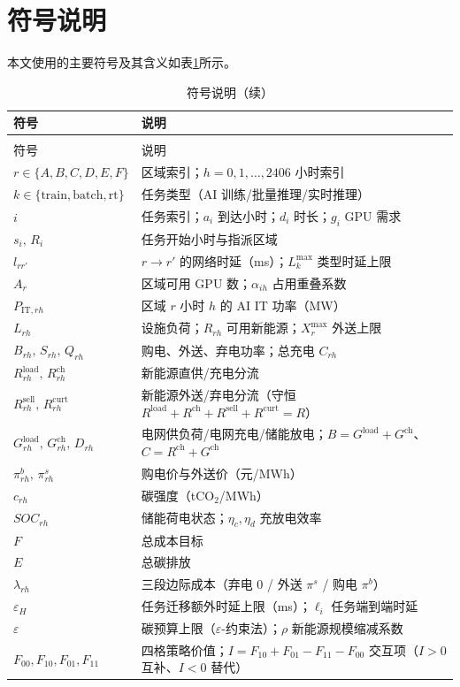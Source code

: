 \section{符号说明}

本文使用的主要符号及其含义如表\ref{tab:符号说明}所示。

\begin{longtable}{>{\centering\arraybackslash}p{}>{\centering\arraybackslash}p{}}
  \caption{符号说明}
  \label{tab:符号说明} \\
  \toprule
  符号 & 说明 \\
  \midrule
  \endfirsthead
  \caption{符号说明（续）} \\
  \toprule
  符号 & 说明 \\
  \midrule
  \endhead
  \bottomrule
  \endfoot
  $r\in\{A,B,C,D,E,F\}$ & 区域索引；$h=0,1,\dots,2406$ 小时索引 \\
  $k\in\{\mathrm{train},\mathrm{batch},\mathrm{rt}\}$ & 任务类型（AI 训练/批量推理/实时推理） \\
  $i$ & 任务索引；$a_i$ 到达小时；$d_i$ 时长；$g_i$ GPU 需求 \\
  $s_i,\,R_i$ & 任务开始小时与指派区域 \\
  $l_{r r'}$ & $r\to r'$ 的网络时延（ms）；$L_k^{\max}$ 类型时延上限 \\
  $A_r$ & 区域可用 GPU 数；$\alpha_{i h}$ 占用重叠系数 \\
  $P_{\mathrm{IT},rh}$ & 区域 $r$ 小时 $h$ 的 AI IT 功率（MW） \\
  $L_{rh}$ & 设施负荷；$R_{rh}$ 可用新能源；$X_r^{\max}$ 外送上限 \\
  $B_{rh},\,S_{rh},\,Q_{rh}$ & 购电、外送、弃电功率；总充电 $C_{rh}$ \\
  $R^{\mathrm{load}}_{rh},\,R^{\mathrm{ch}}_{rh}$ & 新能源直供/充电分流 \\
  $R^{\mathrm{sell}}_{rh},\,R^{\mathrm{curt}}_{rh}$ & 新能源外送/弃电分流（守恒 $R^{\mathrm{load}}+R^{\mathrm{ch}}+R^{\mathrm{sell}}+R^{\mathrm{curt}}=R$） \\
  $G^{\mathrm{load}}_{rh},\,G^{\mathrm{ch}}_{rh},\,D_{rh}$ & 电网供负荷/电网充电/储能放电；$B=G^{\mathrm{load}}+G^{\mathrm{ch}}$、$C=R^{\mathrm{ch}}+G^{\mathrm{ch}}$ \\
  $\pi_{rh}^b,\,\pi_{rh}^s$ & 购电价与外送价（元/MWh） \\
  $c_{rh}$ & 碳强度（tCO$_2$/MWh） \\
  $SOC_{rh}$ & 储能荷电状态；$\eta_c,\eta_d$ 充放电效率 \\
  $F$ & 总成本目标 \\
  $E$ & 总碳排放 \\
  $\lambda_{rh}$ & 三段边际成本（弃电 0 / 外送 $\pi^s$ / 购电 $\pi^b$） \\
  $\varepsilon_H$ & 任务迁移额外时延上限（ms）；$\ell_i$ 任务端到端时延 \\
  $\varepsilon$ & 碳预算上限（$\varepsilon$-约束法）；$\rho$ 新能源规模缩减系数 \\
  $F_{00},F_{10},F_{01},F_{11}$ & 四格策略价值；$I=F_{10}+F_{01}-F_{11}-F_{00}$ 交互项（$I>0$ 互补、$I<0$ 替代） \\
\end{longtable}
